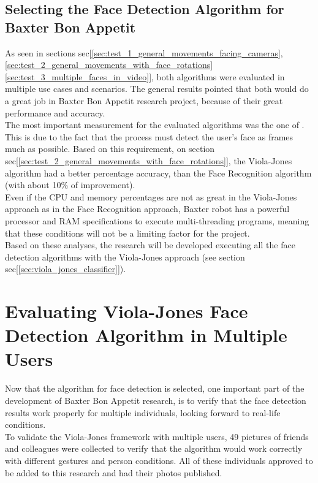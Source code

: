 \documentclass[11pt]{report} %
\begin{document}
\subsection{Selecting the Face Detection Algorithm for Baxter Bon Appetit}

As seen in sections sec[\ref{sec:test_1_general_movements_facing_cameras}, \ref{sec:test_2_general_movements_with_face_rotations} \ref{sec:test_3_multiple_faces_in_video}], both algorithms were evaluated in multiple use cases and scenarios. The general results pointed that both would do a great job in Baxter Bon Appetit research project, because of their great performance and accuracy.\\

The most important measurement for the evaluated algorithms was the one of . This is due to the fact that the process must detect the user's face as frames much as possible. Based on this requirement, on section sec[\ref{sec:test_2_general_movements_with_face_rotations}], the Viola-Jones algorithm had a better percentage accuracy, than the Face Recognition algorithm (with about 10\% of improvement).\\

Even if the CPU and memory percentages are not as great in the Viola-Jones approach as in the Face Recognition approach, Baxter robot has a powerful processor and RAM specifications to execute multi-threading programs, meaning that these conditions will not be a limiting factor for the project.\\

Based on these analyses, the research will be developed executing all the face detection algorithms with the Viola-Jones approach (see section sec[\ref{sec:viola_jones_classifier}]).\\


\section{Evaluating Viola-Jones Face Detection Algorithm in Multiple Users}

Now that the algorithm for face detection is selected, one important part of the development of Baxter Bon Appetit research, is to verify that the face detection results work properly for multiple individuals, looking forward to real-life conditions.\\

To validate the Viola-Jones framework with multiple users, 49 pictures of friends and colleagues were collected to verify that the algorithm would work correctly with different gestures and person conditions. All of these individuals approved to be added to this research and had their photos published.\\
\end{document}
